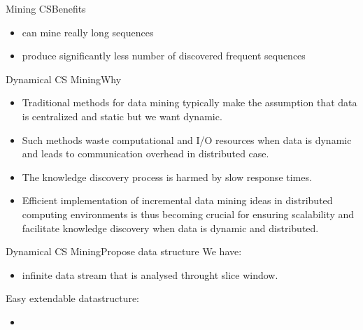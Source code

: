 \documentclass[12pt]{beamer}
\begin{document}
\begin{frame}{Mining CS}{Benefits}
\begin{itemize}
\item can mine really long sequences
\item produce significantly less number of discovered frequent sequences
\end{itemize}
\end{frame}

\begin{frame}{Dynamical CS Mining}{Why}
\begin{itemize}
  \item Traditional methods for data mining typically make the assumption that data is centralized and static but we want dynamic.
  \item Such methods waste computational and I/O resources when data is dynamic and leads to communication overhead in distributed case.
  \item The knowledge discovery process is harmed by slow response times.
  \item Efficient implementation of incremental data mining ideas in distributed computing environments is thus becoming crucial for ensuring scalability and facilitate knowledge discovery when data is dynamic and distributed.
\end{itemize}
\end{frame}

\begin{frame}{Dynamical CS Mining}{Propose data structure}
We have:
\begin{itemize}
  \item infinite data stream that is analysed throught slice window.
\end{itemize}
Easy extendable datastructure:
\begin{itemize}
  \item 
\end{itemize}
\end{frame}
\end{document}
